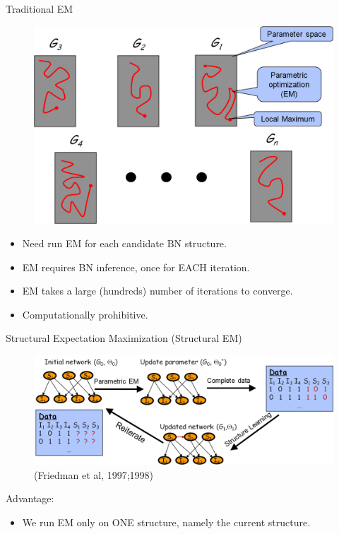 \documentclass[hyperref={pdfpagelabels=false}]{beamer}
\begin{document}
\begin{frame}{Traditional EM}	
	\begin{figure}[h]
		\begin{center}
			\includegraphics[scale = .35]{figures/traditionalEM.png}%
		\end{center}
	\end{figure}
	
	\begin{itemize}\footnotesize
		\item Need run EM for each candidate BN structure.
		\item EM requires BN inference, once for EACH iteration.
		\item EM takes a large (hundreds) number of iterations to converge.
		\item Computationally prohibitive.
	\end{itemize}
\end{frame}

\begin{frame}{Structural Expectation Maximization (Structural EM)}
	\begin{figure}[h]
		\begin{center}
			\includegraphics[scale = .48]{figures/sem.png}\\
			{\small (Friedman et al, 1997;1998)}
		\end{center}
	\end{figure}
	Advantage:
	\begin{itemize}\footnotesize
		\item We run EM only on ONE structure, namely the current structure.
	\end{itemize}
\end{frame}
\end{document}
